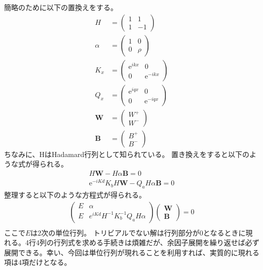 \documentclass[a4paper, lualatex]{bxjsarticle}
\begin{document}
    簡略のために以下の置換えをする。
    \begin{align}
     H&=\begin{pmatrix} 1 & 1 \\ 1 & -1 \end{pmatrix}\nonumber\\
        \alpha &=\begin{pmatrix} 1 & 0 \\ 0 & \rho  \end{pmatrix}\nonumber\\
        K_x&=\begin{pmatrix} \mathrm{e}^{ikx} & 0 \\ 0 &  \mathrm{e}^{-ikx} \end{pmatrix}\nonumber\\
        Q_x&=\begin{pmatrix} \mathrm{e}^{iqx} & 0 \\ 0 &  \mathrm{e}^{-iqx} \end{pmatrix}\nonumber\\
        \mathbf{W}& = \begin{pmatrix} W^{+} \\ W^{-} \end{pmatrix}\nonumber\\
        \mathbf{B}& = \begin{pmatrix} B^{+} \\ B^{-} \end{pmatrix}
    \end{align}
    ちなみに、HはHadamard行列として知られている。
    置き換えをすると以下のような式が得られる。
    \begin{align}
     H \mathbf{W} - H \alpha \mathbf{B} = 0\nonumber\\
        \mathrm{e}^{-iKd} K_b H \mathbf{W} - Q_a H \alpha \mathbf{B} = 0
    \end{align}
    整理すると以下のような方程式が得られる。
    \begin{align}
     \begin{pmatrix} E & \alpha  \\ E & { e }^{ iKd }H^{ -1 }K_{ b }^{ -1 } Q_{ a }H\alpha  \end{pmatrix}\begin{pmatrix} \mathbf{ W } \\ \mathbf{ B } \end{pmatrix}=0\nonumber\\
    \end{align}
    ここで$E$は2次の単位行列。
    トリビアルでない解は行列部分が0となるときに現れる。4行4列の行列式を求める手続きは煩雑だが、余因子展開を繰り返せば必ず展開できる。幸い、今回は単位行列が現れることを利用すれば、実質的に現れる項は4項だけとなる。
\end{document}
